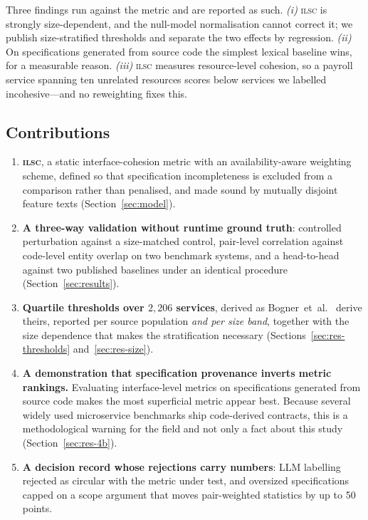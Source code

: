 \documentclass[journal]{IEEEtran}
\newcommand{\ilsc}{\textsc{ilsc}}
\begin{document}
Three findings run against the metric and are reported as such. \emph{(i)}
\ilsc{} is strongly size-dependent, and the null-model normalisation cannot
correct it; we publish size-stratified thresholds and separate the two effects
by regression. \emph{(ii)} On specifications generated from source code the
simplest lexical baseline wins, for a measurable reason. \emph{(iii)} \ilsc{}
measures resource-level cohesion, so a payroll service spanning ten unrelated
resources scores below services we labelled incohesive---and no reweighting
fixes this.

\subsection{Contributions}
\begin{enumerate}
\item \textbf{\ilsc{}}, a static interface-cohesion metric with an
      availability-aware weighting scheme, defined so that specification
      incompleteness is excluded from a comparison rather than penalised, and
      made sound by mutually disjoint feature texts
      (Section~\ref{sec:model}).
\item \textbf{A three-way validation without runtime ground truth}: controlled
      perturbation against a size-matched control, pair-level correlation
      against code-level entity overlap on two benchmark systems, and a
      head-to-head against two published baselines under an identical procedure
      (Section~\ref{sec:results}).
\item \textbf{Quartile thresholds over $2{,}206$ services}, derived as
      Bogner~et~al.~\cite{bogner2020rama} derive theirs, reported per source
      population \emph{and per size band}, together with the size dependence
      that makes the stratification necessary
      (Sections~\ref{sec:res-thresholds} and~\ref{sec:res-size}).
\item \textbf{A demonstration that specification provenance inverts metric
      rankings.} Evaluating interface-level metrics on specifications generated
      from source code makes the most superficial metric appear best. Because
      several widely used microservice benchmarks ship code-derived contracts,
      this is a methodological warning for the field and not only a fact about
      this study (Section~\ref{sec:res-4b}).
\item \textbf{A decision record whose rejections carry numbers}: LLM
      labelling rejected as circular with the metric under test, and oversized
      specifications capped on a scope argument that moves pair-weighted
      statistics by up to 50 points.
\end{enumerate}
\end{document}
